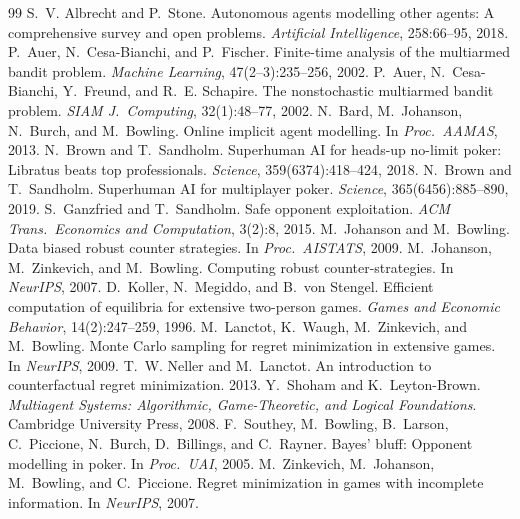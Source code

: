 \documentclass[11pt]{article}
\begin{document}
\begin{thebibliography}{99}\small
{} S.~V. Albrecht and P.~Stone. Autonomous agents modelling other agents: A comprehensive survey and open problems. \emph{Artificial Intelligence}, 258:66--95, 2018.
 P.~Auer, N.~Cesa-Bianchi, and P.~Fischer. Finite-time analysis of the multiarmed bandit problem. \emph{Machine Learning}, 47(2--3):235--256, 2002.
 P.~Auer, N.~Cesa-Bianchi, Y.~Freund, and R.~E. Schapire. The nonstochastic multiarmed bandit problem. \emph{SIAM J.\ Computing}, 32(1):48--77, 2002.
 N.~Bard, M.~Johanson, N.~Burch, and M.~Bowling. Online implicit agent modelling. In \emph{Proc.\ AAMAS}, 2013.
 N.~Brown and T.~Sandholm. Superhuman AI for heads-up no-limit poker: Libratus beats top professionals. \emph{Science}, 359(6374):418--424, 2018.
 N.~Brown and T.~Sandholm. Superhuman AI for multiplayer poker. \emph{Science}, 365(6456):885--890, 2019.
 S.~Ganzfried and T.~Sandholm. Safe opponent exploitation. \emph{ACM Trans.\ Economics and Computation}, 3(2):8, 2015.
 M.~Johanson and M.~Bowling. Data biased robust counter strategies. In \emph{Proc.\ AISTATS}, 2009.
 M.~Johanson, M.~Zinkevich, and M.~Bowling. Computing robust counter-strategies. In \emph{NeurIPS}, 2007.
 D.~Koller, N.~Megiddo, and B.~von Stengel. Efficient computation of equilibria for extensive two-person games. \emph{Games and Economic Behavior}, 14(2):247--259, 1996.
 M.~Lanctot, K.~Waugh, M.~Zinkevich, and M.~Bowling. Monte Carlo sampling for regret minimization in extensive games. In \emph{NeurIPS}, 2009.
 T.~W. Neller and M.~Lanctot. An introduction to counterfactual regret minimization. 2013.
 Y.~Shoham and K.~Leyton-Brown. \emph{Multiagent Systems: Algorithmic, Game-Theoretic, and Logical Foundations}. Cambridge University Press, 2008.
 F.~Southey, M.~Bowling, B.~Larson, C.~Piccione, N.~Burch, D.~Billings, and C.~Rayner. Bayes' bluff: Opponent modelling in poker. In \emph{Proc.\ UAI}, 2005.
 M.~Zinkevich, M.~Johanson, M.~Bowling, and C.~Piccione. Regret minimization in games with incomplete information. In \emph{NeurIPS}, 2007.
\end{thebibliography}
\end{document}
